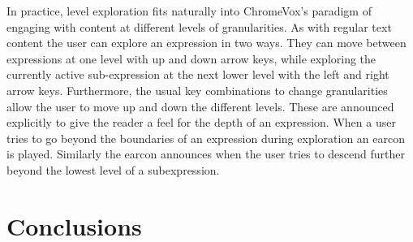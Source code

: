 \documentclass{acm_proc_article-sp}
\begin{document}
In practice, level exploration fits naturally into ChromeVox's paradigm of
engaging with content at different levels of granularities. As with regular text
content the user can explore an expression in two ways. They can move between
expressions at one level with up and down arrow keys, while exploring the
currently active sub-expression at the next lower level with the left and right
arrow keys. Furthermore, the usual key combinations to change granularities
allow the user to move up and down the different levels. These are announced
explicitly to give the reader a feel for the depth of an expression.  When a
user tries to go beyond the boundaries of an expression during exploration an
earcon is played. Similarly the earcon announces when the user tries to descend
further beyond the lowest level of a subexpression.


\section{Conclusions}
\label{sec:conc}


 
\end{document}
